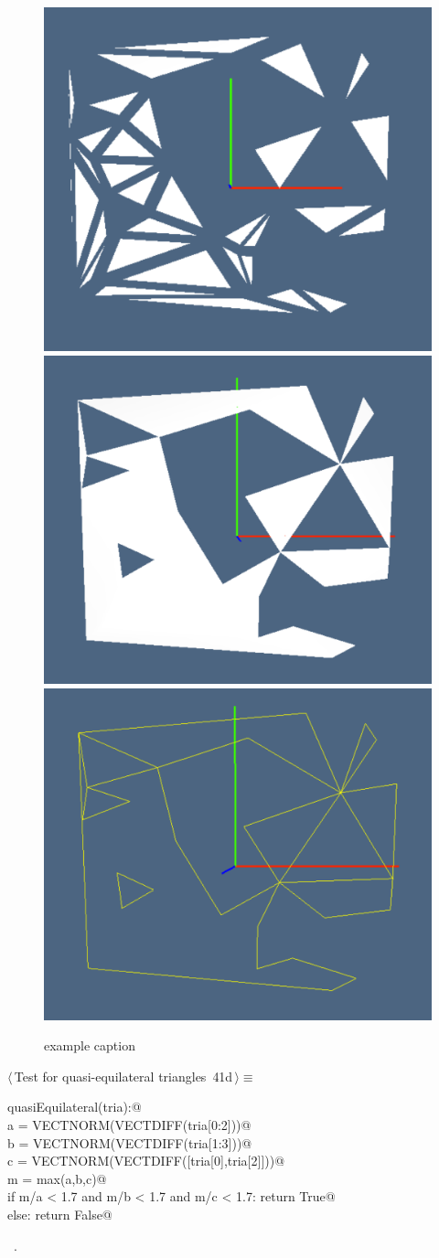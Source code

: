 \documentclass[11pt,oneside]{article}	%
\begin{document}
\begin{figure}[htbp] %
   \centering
   \includegraphics[height=0.25\linewidth,width=0.32\linewidth]{images/tria0} 
   \includegraphics[height=0.25\linewidth,width=0.32\linewidth]{images/tria1} 
   \includegraphics[height=0.25\linewidth,width=0.32\linewidth]{images/tria2} 
   \caption{example caption}
   \label{fig:example}
\end{figure}

\begin{flushleft} \small \label{scrap88}
\protect{}$\langle\,$Test for quasi-equilateral triangles\nobreak\ {\footnotesize 41d}$\,\rangle\equiv$
\vspace{-1ex}
\begin{list}{}{} \item
\mbox{}\verb@def quasiEquilateral(tria):@\\
\mbox{}\verb@   a = VECTNORM(VECTDIFF(tria[0:2]))@\\
\mbox{}\verb@   b = VECTNORM(VECTDIFF(tria[1:3]))@\\
\mbox{}\verb@   c = VECTNORM(VECTDIFF([tria[0],tria[2]]))@\\
\mbox{}\verb@   m = max(a,b,c)@\\
\mbox{}\verb@   if m/a < 1.7 and m/b < 1.7 and m/c < 1.7: return True@\\
\mbox{}\verb@   else: return False@\\
\mbox{}\verb@@{\NWsep}
\end{list}
\vspace{-1ex}
\footnotesize\addtolength{\baselineskip}{-1ex}
\begin{list}{}{\setlength{\itemsep}{-\parsep}\setlength{\itemindent}{-\leftmargin}}
\item \NWtxtMacroRefIn\ .
\end{list}
\end{flushleft}
\end{document}
